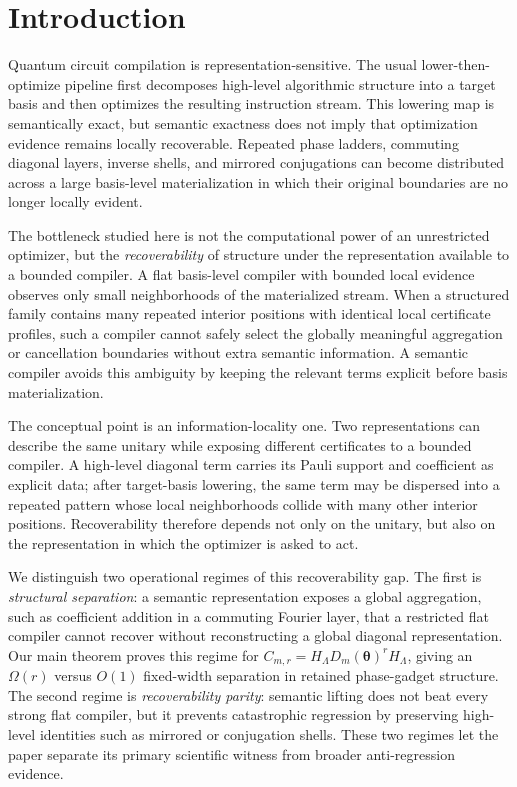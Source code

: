 \documentclass[11pt]{article}
\begin{document}
\section{Introduction}

Quantum circuit compilation is representation-sensitive. The usual
lower-then-optimize pipeline first decomposes high-level algorithmic structure
into a target basis and then optimizes the resulting instruction stream. This
lowering map is semantically exact, but semantic exactness does not imply that
optimization evidence remains locally recoverable. Repeated phase ladders,
commuting diagonal layers, inverse shells, and mirrored conjugations can become
distributed across a large basis-level materialization in which their original
boundaries are no longer locally evident.

The bottleneck studied here is not the computational power of an unrestricted
optimizer, but the \emph{recoverability} of structure under the representation
available to a bounded compiler. A flat basis-level compiler with bounded local
evidence observes only small neighborhoods of the materialized stream. When a
structured family contains many repeated interior positions with identical
local certificate profiles, such a compiler cannot safely select the globally
meaningful aggregation or cancellation boundaries without extra semantic
information. A semantic compiler avoids this ambiguity by keeping the relevant
terms explicit before basis materialization.

The conceptual point is an information-locality one. Two representations can
describe the same unitary while exposing different certificates to a bounded
compiler. A high-level diagonal term carries its Pauli support and coefficient
as explicit data; after target-basis lowering, the same term may be dispersed
into a repeated pattern whose local neighborhoods collide with many other
interior positions. Recoverability therefore depends not only on the unitary,
but also on the representation in which the optimizer is asked to act.

We distinguish two operational regimes of this recoverability gap. The first is
\emph{structural separation}: a semantic representation exposes a global
aggregation, such as coefficient addition in a commuting Fourier layer, that a
restricted flat compiler cannot recover without reconstructing a global
diagonal representation. Our main theorem proves this regime for
$C_{m,r}=H_{\Lambda}D_m(\boldsymbol{\theta})^rH_{\Lambda}$, giving an
$\Omega(r)$ versus $O(1)$ fixed-width separation in retained phase-gadget
structure. The second regime is \emph{recoverability parity}: semantic lifting
does not beat every strong flat compiler, but it prevents catastrophic
regression by preserving high-level identities such as mirrored or conjugation
shells. These two regimes let the paper separate its primary scientific
witness from broader anti-regression evidence.
\end{document}
